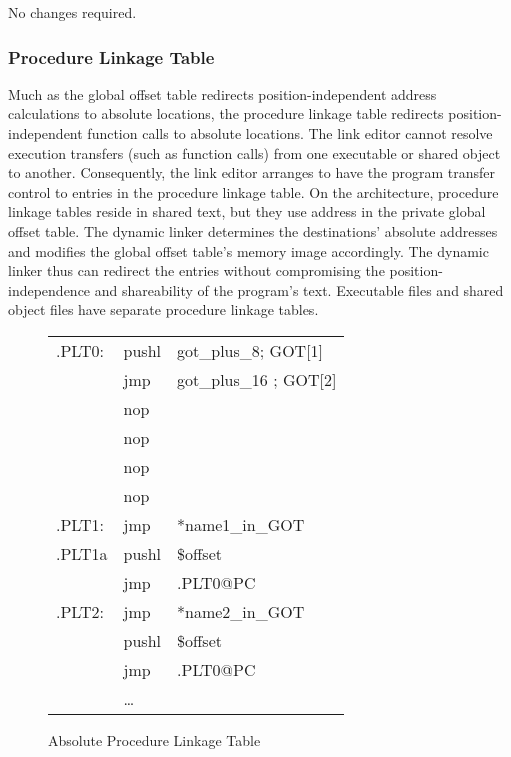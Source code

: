 No changes required.

\subsubsection{Procedure Linkage Table}



Much as the global offset table redirects position-independent address
calculations to absolute locations, the procedure linkage table
redirects position-independent function calls to absolute locations.
The link editor cannot resolve execution transfers (such as function
calls) from one executable or shared object to another.  Consequently,
the link editor arranges to have the program transfer control to
entries in the procedure linkage table.  On the \xARCH architecture,
procedure linkage tables reside in shared text, but they use address
in the private global offset table.  The dynamic linker determines the
destinations' absolute addresses and modifies the global offset
table's memory image accordingly.  The dynamic linker thus can
redirect the entries without compromising the position-independence
and shareability of the program's text.  Executable files and shared
object files have separate procedure linkage tables.  


\begin{figure}[H]
\caption{Absolute Procedure Linkage Table}
\begin{tabular}{lll}
.PLT0: & pushl & got\_plus\_8; GOT[1]\\
& jmp &got\_plus\_16 ; GOT[2] \\
& nop & \\
& nop & \\
& nop & \\
& nop & \\
.PLT1: & jmp & *name1\_in\_GOT\\
.PLT1a& pushl & \$offset \\
&jmp &.PLT0@PC \\
.PLT2: & jmp& *name2\_in\_GOT\\
&pushl & \$offset \\
& jmp & .PLT0@PC \\
&\dots\\
\end{tabular}
\end{figure}

